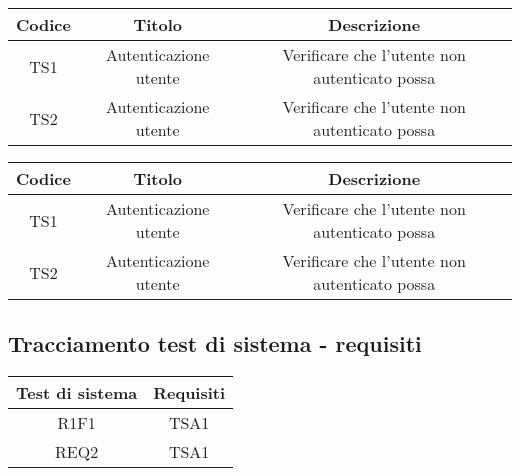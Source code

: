 \begin{center}
	\begin{longtable}{|c|c|c|}
	\hline
	\rowcolor{lighter-grayer}
	\textbf{Codice} & \textbf{Titolo} & \textbf{Descrizione} \\
	\hline
	\endfirsthead



	\hline
	TS1 & Autenticazione utente & Verificare che l'utente non autenticato possa  \\
	TS2 & Autenticazione utente & Verificare che l'utente non autenticato possa  \\

	\hline

	\end{longtable}
\end{center}

\begin{center}
	\begin{longtable}{|c|c|c|}
	\hline
	\rowcolor{lighter-grayer}
	\textbf{Codice} & \textbf{Titolo} & \textbf{Descrizione} \\
	\hline
	\endfirsthead



	\hline
	TS1 & Autenticazione utente & Verificare che l'utente non autenticato possa  \\
	TS2 & Autenticazione utente & Verificare che l'utente non autenticato possa  \\

	\hline

	\end{longtable}
\end{center}


\subsection{Tracciamento test di sistema - requisiti}

\begin{center}
	\begin{longtable}{|c|c|}
	\hline
	\rowcolor{lighter-grayer}
	\textbf{Test di sistema} & \textbf{Requisiti} \\
	\hline
	\endfirsthead


	
	\hline
	R1F1 & TSA1  \\
	REQ2 & TSA1 \\

	\hline

	\end{longtable}
\end{center}

